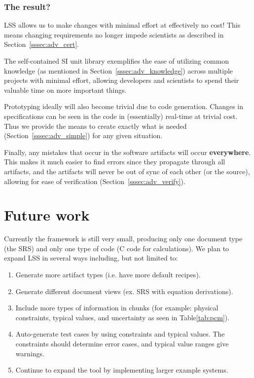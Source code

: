\documentclass{sig-alternate-05-2015}
\newcommand{\lss}{LSS}
\begin{document}
\subsubsection{The result?} \label{sssec:ex_result}

\lss{} allows us to make changes with minimal effort at effectively no cost!
This means changing requirements no longer impede scientists as described in
Section~\ref{sssec:adv_cert}.

The self-contained SI unit library exemplifies the ease of utilizing common
knowledge (as mentioned in Section~\ref{sssec:adv_knowledge}) across multiple
projects with minimal effort, allowing developers and scientists to spend their
valuable time on more important things.

Prototyping ideally will also become trivial due to code generation. Changes in
specifications can be seen in the code in (essentially) real-time at trivial
cost. Thus we provide the means to create exactly what is needed
(Section~\ref{sssec:adv_simple}) for any given situation.

Finally, any mistakes that occur in the software artifacts will occur
\textbf{everywhere}. This makes it much easier to find errors since they
propagate through all artifacts, and the artifacts will never be out of sync of
each other (or the source), allowing for ease of verification
(Section~\ref{sssec:adv_verify}).

\section{Future work} \label{sec:todo}

Currently the framework is still very small, producing only one document type
(the SRS) and only one type of code (C code for calculations). We plan to expand
\lss{} in several ways including, but not limited to:

\begin{enumerate}
\item Generate more artifact types (i.e. have more default recipes).
\item Generate different document views (ex. SRS with equation derivations).
\item Include more types of information in chunks (for example: physical
  constraints, typical values, and uncertainty as seen in Table\ref{tab:pcm}).
\item Auto-generate test cases by using constraints and typical values. The
  constraints should determine error cases, and typical value ranges give
  warnings.
\item Continue to expand the tool by implementing larger example systems.
\end{enumerate}
\end{document}
